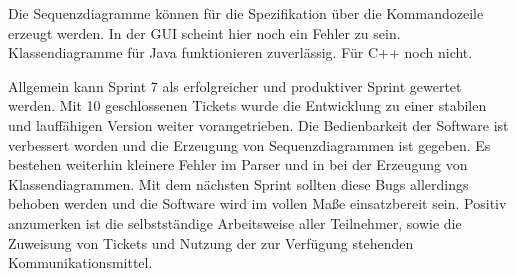Die Sequenzdiagramme können für die Spezifikation über die Kommandozeile erzeugt werden. In der GUI scheint hier noch ein Fehler zu sein. Klassendiagramme für Java funktionieren zuverlässig. Für C++ noch nicht. 
\nsecend%

Allgemein kann Sprint 7 als erfolgreicher und produktiver Sprint gewertet werden. Mit 10 geschlossenen Tickets wurde die Entwicklung zu einer stabilen und lauffähigen Version weiter vorangetrieben. Die Bedienbarkeit der Software ist verbessert worden und die Erzeugung von Sequenzdiagrammen ist gegeben. Es bestehen weiterhin kleinere Fehler im Parser und in bei der Erzeugung von Klassendiagrammen. Mit dem nächsten Sprint sollten diese Bugs allerdings behoben werden und die Software wird im vollen Maße einsatzbereit sein.
Positiv anzumerken ist die selbstständige Arbeitsweise aller Teilnehmer, sowie die Zuweisung von Tickets und Nutzung der zur Verfügung stehenden Kommunikationsmittel.
\nsecend%